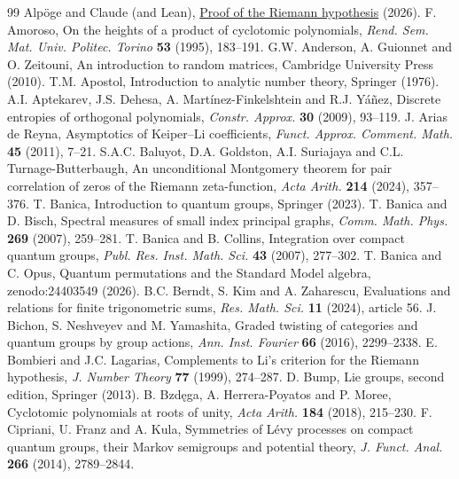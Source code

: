 \documentclass[11pt,a4paper]{article}
\begin{document}
\begin{thebibliography}{99}
\setlength{\baselineskip}{12pt}
 Alp\"oge and Claude (and Lean), \href{https://alpo.ge/remark.pdf}{Proof of the Riemann hypothesis} (2026).
 F. Amoroso, On the heights of a product of cyclotomic polynomials, \textit{Rend. Sem. Mat. Univ. Politec. Torino} \textbf{53} (1995), 183--191.
 G.W. Anderson, A. Guionnet and O. Zeitouni, An introduction to random matrices, Cambridge University Press (2010).
 T.M. Apostol, Introduction to analytic number theory, Springer (1976).
 A.I. Aptekarev, J.S. Dehesa, A. Mart\'inez-Finkelshtein and R.J. Y\'a\~nez, Discrete entropies of orthogonal polynomials, \textit{Constr. Approx.} \textbf{30} (2009), 93--119.
 J. Arias de Reyna, Asymptotics of Keiper--Li coefficients, \textit{Funct. Approx. Comment. Math.} \textbf{45} (2011), 7--21.
 S.A.C. Baluyot, D.A. Goldston, A.I. Suriajaya and C.L. Turnage-Butterbaugh, An unconditional Montgomery theorem for pair correlation of zeros of the Riemann zeta-function, \textit{Acta Arith.} \textbf{214} (2024), 357--376.
 T. Banica, Introduction to quantum groups, Springer (2023).
 T. Banica and D. Bisch, Spectral measures of small index principal graphs, \textit{Comm. Math. Phys.} \textbf{269} (2007), 259--281.
 T. Banica and B. Collins, Integration over compact quantum groups, \textit{Publ. Res. Inst. Math. Sci.} \textbf{43} (2007), 277--302.
 T. Banica and C. Opus, Quantum permutations and the Standard Model algebra, \mbox{zenodo:24403549} (2026).
 B.C. Berndt, S. Kim and A. Zaharescu, Evaluations and relations for finite trigonometric sums, \textit{Res. Math. Sci.} \textbf{11} (2024), article 56.
 J. Bichon, S. Neshveyev and M. Yamashita, Graded twisting of categories and quantum groups by group actions, \textit{Ann. Inst. Fourier} \textbf{66} (2016), 2299--2338.
 E. Bombieri and J.C. Lagarias, Complements to Li's criterion for the Riemann hypothesis, \textit{J. Number Theory} \textbf{77} (1999), 274--287.
 D. Bump, Lie groups, second edition, Springer (2013).
 B. Bzd\k{e}ga, A. Herrera-Poyatos and P. Moree, Cyclotomic polynomials at roots of unity, \textit{Acta Arith.} \textbf{184} (2018), 215--230.
 F. Cipriani, U. Franz and A. Kula, Symmetries of L\'evy processes on compact quantum groups, their Markov semigroups and potential theory, \textit{J. Funct. Anal.} \textbf{266} (2014), 2789--2844.

\end{thebibliography}
\end{document}
